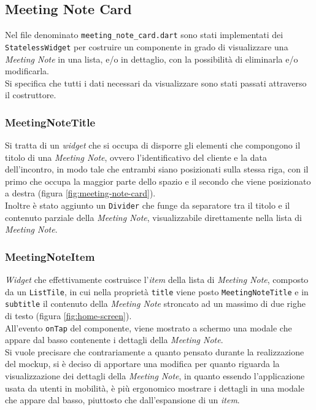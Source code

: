 \subsection{Meeting Note Card}
\label{subsec:meeting-note-card}

Nel file denominato \lstinline{meeting_note_card.dart} sono stati implementati dei \lstinline{StatelessWidget} per costruire un componente in grado di visualizzare una \emph{Meeting Note} in una lista, e/o in dettaglio, con la possibilità di eliminarla e/o modificarla. \\
Si specifica che tutti i dati necessari da visualizzare sono stati passati attraverso il costruttore.

\subsubsection*{MeetingNoteTitle}
\label{subsubsec:meeting-note-title}

Si tratta di un \emph{widget} che si occupa di disporre gli elementi che compongono il titolo di una 
\emph{Meeting Note}, ovvero l'identificativo del cliente e la data dell'incontro, in modo tale che entrambi siano posizionati sulla stessa riga, con il primo che occupa la maggior parte dello spazio e il secondo che viene posizionato a destra (figura \ref{fig:meeting-note-card}).\\
Inoltre è stato aggiunto un \lstinline{Divider}\cite{site:divider} che funge da separatore tra il titolo e il contenuto parziale della \emph{Meeting Note}, visualizzabile direttamente nella lista di \emph{Meeting Note}.

\subsubsection*{MeetingNoteItem}
\label{subsubsec:meeting-note-item}

\emph{Widget} che effettivamente costruisce l'\emph{item} della lista di \emph{Meeting Note}, composto da un \lstinline{ListTile}\cite{site:list-tile}, in cui nella proprietà \lstinline{title} viene posto \lstinline{MeetingNoteTitle} e in \lstinline{subtitle} il contenuto della \emph{Meeting Note} stroncato ad un massimo di due righe di testo (figura \ref{fig:home-screen}).\\
All'evento \lstinline{onTap} del componente, viene mostrato a schermo una modale che appare dal basso contenente i dettagli della \emph{Meeting Note}.\\
Si vuole precisare che contrariamente a quanto pensato durante la realizzazione del \gls{mockup}\glsoccur, si è deciso di apportare una modifica per quanto riguarda la visualizzazione dei dettagli della \emph{Meeting Note}, in quanto essendo l'applicazione usata da utenti in mobilità, è più ergonomico mostrare i dettagli in una modale che appare dal basso, piuttosto che dall'espansione di un \emph{item}.

